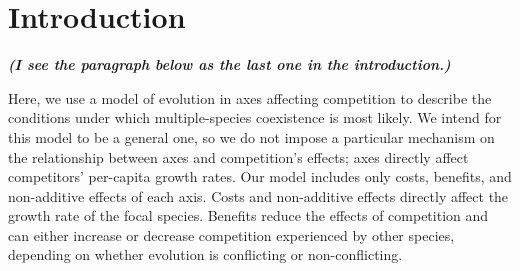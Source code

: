 
\section*{Introduction}

%
%

\textit{\textbf{(I see the paragraph below as the last one in the introduction.)}}

Here, we use a model of evolution in axes affecting competition to describe
the conditions under which multiple-species coexistence is most likely.
We intend for this model to be a general one, so we do not impose a particular 
mechanism on the relationship between axes and competition’s effects;
axes directly affect competitors' per-capita growth rates.
Our model includes only costs, benefits, and non-additive effects of each axis. 
Costs and non-additive effects directly affect the growth rate of the focal species.
Benefits reduce the effects of competition and can either increase or decrease 
competition experienced by other species, depending
on whether evolution is conflicting or non-conflicting.


